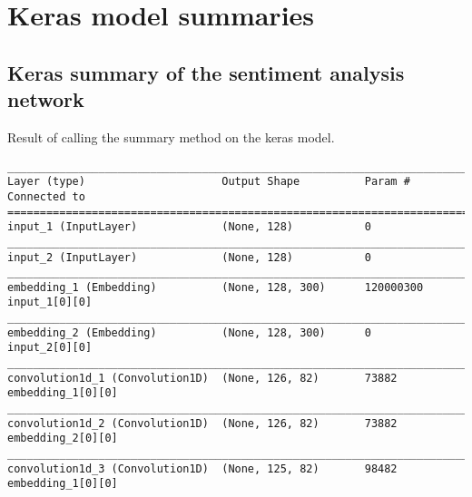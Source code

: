 \chapter{Keras model summaries}

\section{Keras summary of the sentiment analysis network}
\singlespacing

Result of calling the summary method on the keras model.

\begin{lstlisting}[basicstyle=\tiny,frame=single]
____________________________________________________________________________________________________                                                                               
Layer (type)                     Output Shape          Param #     Connected to                                                                                                                              
====================================================================================================                                                                                                         
input_1 (InputLayer)             (None, 128)           0                                              
____________________________________________________________________________________________________  
input_2 (InputLayer)             (None, 128)           0                                              
____________________________________________________________________________________________________  
embedding_1 (Embedding)          (None, 128, 300)      120000300   input_1[0][0]                      
____________________________________________________________________________________________________  
embedding_2 (Embedding)          (None, 128, 300)      0           input_2[0][0]                      
____________________________________________________________________________________________________  
convolution1d_1 (Convolution1D)  (None, 126, 82)       73882       embedding_1[0][0]                  
____________________________________________________________________________________________________  
convolution1d_2 (Convolution1D)  (None, 126, 82)       73882       embedding_2[0][0]                  
____________________________________________________________________________________________________  
convolution1d_3 (Convolution1D)  (None, 125, 82)       98482       embedding_1[0][0]                  

\end{lstlisting}

